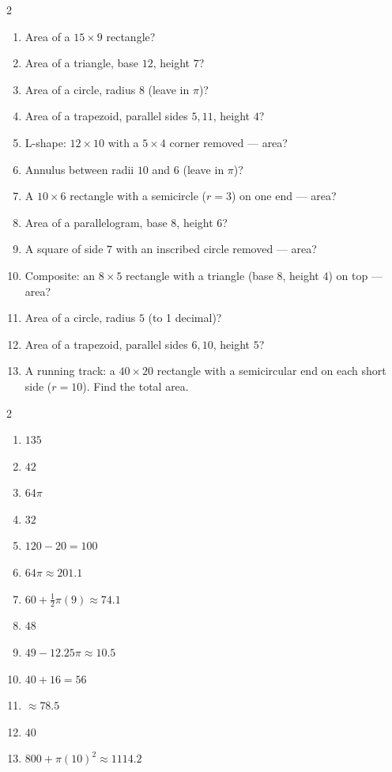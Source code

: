 \documentclass[11pt]{article}
\begin{document}
\begin{recapbox}
\begin{multicols}{2}
\small
\begin{enumerate}[leftmargin=*,itemsep=3pt]
  \item Area of a $15\times9$ rectangle?
  \item Area of a triangle, base $12$, height $7$?
  \item Area of a circle, radius $8$ (leave in $\pi$)?
  \item Area of a trapezoid, parallel sides $5,11$, height $4$?
  \item L-shape: $12\times10$ with a $5\times4$ corner removed — area?
  \item Annulus between radii $10$ and $6$ (leave in $\pi$)?
  \item A $10\times6$ rectangle with a semicircle ($r=3$) on one end — area?
  \item Area of a parallelogram, base $8$, height $6$?
  \item A square of side $7$ with an inscribed circle removed — area?
  \item Composite: an $8\times5$ rectangle with a triangle (base $8$, height $4$) on top — area?
  \item Area of a circle, radius $5$ (to 1 decimal)?
  \item Area of a trapezoid, parallel sides $6,10$, height $5$?
  \item A running track: a $40\times20$ rectangle with a semicircular end on each short side ($r=10$). Find the total area.
\end{enumerate}
\end{multicols}
\end{recapbox}

\begin{keybox}
\begin{multicols}{2}
\small
\begin{enumerate}[leftmargin=*,itemsep=3pt]
  \item $135$
  \item $42$
  \item $64\pi$
  \item $32$
  \item $120-20=100$
  \item $64\pi\approx201.1$
  \item $60+\tfrac12\pi(9)\approx74.1$
  \item $48$
  \item $49-12.25\pi\approx10.5$
  \item $40+16=56$
  \item $\approx78.5$
  \item $40$
  \item $800+\pi(10)^2\approx1114.2$
\end{enumerate}
\end{multicols}
\end{keybox}
\end{document}
